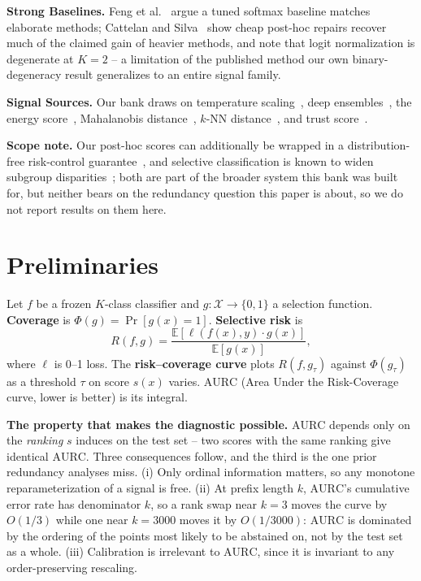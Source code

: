\documentclass[conference]{IEEEtran}
\newcommand{\aurc}{\mathrm{AURC}}
\begin{document}
\textbf{Strong Baselines.} Feng et al.~\cite{feng2023better} argue a tuned softmax baseline matches elaborate methods; Cattelan and Silva~\cite{cattelan2023logitnorm} show cheap post-hoc repairs recover much of the claimed gain of heavier methods, and note that logit normalization is degenerate at $K{=}2$ -- a limitation of the published method our own binary-degeneracy result generalizes to an entire signal family.

\textbf{Signal Sources.} Our bank draws on temperature scaling~\cite{guo2017calibration}, deep ensembles~\cite{lakshminarayanan2017ensembles}, the energy score~\cite{liu2020energy}, Mahalanobis distance~\cite{lee2018mahalanobis}, $k$-NN distance~\cite{sun2022knn}, and trust score~\cite{jiang2018trustscore}.

\textbf{Scope note.} Our post-hoc scores can additionally be wrapped in a distribution-free risk-control guarantee~\cite{angelopoulos2022riskcontrol,angelopoulos2021learnthentest}, and selective classification is known to widen subgroup disparities~\cite{jones2021disparities}; both are part of the broader system this bank was built for, but neither bears on the redundancy question this paper is about, so we do not report results on them here.

\section{Preliminaries}
\label{sec:prelim}

Let $f$ be a frozen $K$-class classifier and $g: \mathcal{X} \to \{0,1\}$ a selection function. \textbf{Coverage} is $\Phi(g) = \Pr[g(x)=1]$. \textbf{Selective risk} is
\begin{equation}
  R(f,g) = \frac{\mathbb{E}[\ell(f(x),y) \cdot g(x)]}{\mathbb{E}[g(x)]},
\end{equation}
where $\ell$ is 0--1 loss. The \textbf{risk--coverage curve} plots $R(f, g_\tau)$ against $\Phi(g_\tau)$ as a threshold $\tau$ on score $s(x)$ varies. $\aurc$ (Area Under the Risk-Coverage curve, lower is better) is its integral.

\textbf{The property that makes the diagnostic possible.} $\aurc$ depends only on the \emph{ranking} $s$ induces on the test set -- two scores with the same ranking give identical $\aurc$. Three consequences follow, and the third is the one prior redundancy analyses miss. (i) Only ordinal information matters, so any monotone reparameterization of a signal is free. (ii) At prefix length $k$, $\aurc$'s cumulative error rate has denominator $k$, so a rank swap near $k{=}3$ moves the curve by $O(1/3)$ while one near $k{=}3000$ moves it by $O(1/3000)$: $\aurc$ is dominated by the ordering of the points most likely to be abstained on, not by the test set as a whole. (iii) Calibration is irrelevant to $\aurc$, since it is invariant to any order-preserving rescaling.
\end{document}
